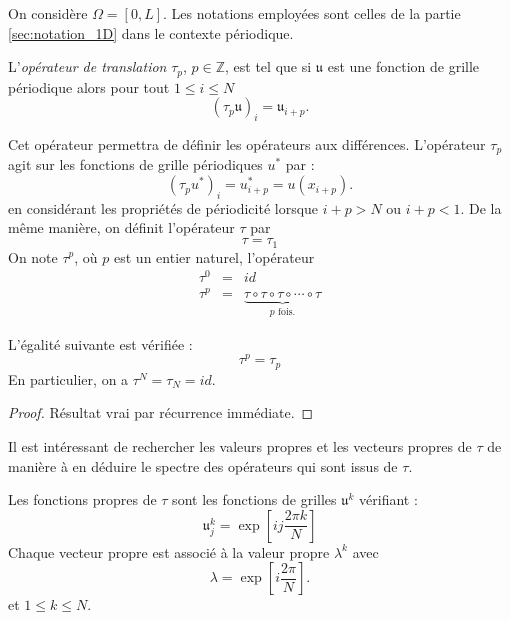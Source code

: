 On considère $\Omega = [0,L]$. Les notations employées sont celles de la partie \ref{sec:notation_1D} dans le contexte périodique.

\begin{definition}
L'\textit{opérateur de translation} $\tau_p$, $p \in \mathbb{Z}$, est tel que si $\mathfrak{u}$ est une fonction de grille périodique alors pour tout $1 \leq i \leq N$
\begin{equation}
(\tau_p \mathfrak{u})_i = \mathfrak{u}_{i+p}.
\end{equation}
\end{definition}

Cet opérateur permettra de définir les opérateurs aux différences. L'opérateur $\tau_p$ agit sur les fonctions de grille périodiques $u^*$ par :
\begin{equation}
(\tau_p u^*)_i = u^*_{i+p} = u(x_{i+p}).
\end{equation}
en considérant les propriétés de périodicité lorsque $i+p > N$ ou $i+p<1$.
De la même manière, on définit l'opérateur $\tau$ par 
\begin{equation}
\tau = \tau_{1}
\end{equation}
On note $\tau^p$, où $p$ est un entier naturel, l'opérateur
\begin{equation}
\begin{array}{rcl}
\tau^0 & = & id\\
\tau^p & = & \underbrace{\tau \circ \tau \circ \tau \circ \cdots \circ \tau}_{p \text{ fois.}}
\end{array}
\end{equation}

\begin{proposition}
L'égalité suivante est vérifiée :
\begin{equation}
\tau^p = \tau_p
\end{equation}
En particulier, on a $\tau^N = \tau_N = id$.
\end{proposition}

\begin{proof}
Résultat vrai par récurrence immédiate.
\end{proof}
Il est intéressant de rechercher les valeurs propres et les vecteurs propres de $\tau$ de manière à en déduire le spectre des opérateurs qui sont issus de $\tau$.


\begin{proposition}
Les fonctions propres de $\tau$ sont les fonctions de grilles $\mathfrak{u}^k$ vérifiant :
\begin{equation}
\mathfrak{u}_j^k = \exp \left[ i j \dfrac{2 \pi k}{N} \right]
\label{eq:vecteurpropre_tau}
\end{equation}
Chaque vecteur propre est associé à la valeur propre $\lambda^k$ avec 
\begin{equation}
\lambda = \exp \left[ i \dfrac{2 \pi}{N} \right].
\end{equation}
et $1 \leq k \leq N$.
\end{proposition}


